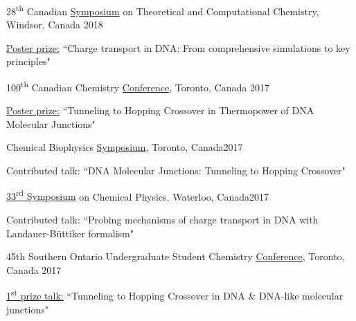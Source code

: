 \documentclass[margin,line]{res}
\newenvironment{list1}{
  \begin{list}{\ding{113}}{%
      \setlength{\itemsep}{0in}
      \setlength{\parsep}{0in} \setlength{\parskip}{0in}
      \setlength{\topsep}{0in} \setlength{\partopsep}{0in} 
      \setlength{\leftmargin}{0.17in}}}{\end{list}}
\begin{document}
\begin{resume}
28\textsuperscript{th} Canadian \href{http://catc.ca/cstcc2018}{Symposium} on Theoretical and Computational Chemistry, Windsor, Canada \hfill {2018}

\begin{list1}
\item[]\underline{Poster prize:} ``Charge transport in DNA: From comprehensive simulations to key principles"
\end{list1}

\vspace*{-2.5mm}

100\textsuperscript{th} Canadian Chemistry \href{https://www.cheminst.ca/magazine/article/csc-celebrates-100-years-of-chemistry-in-toronto/}{Conference}, Toronto, Canada \hfill {2017}

\begin{list1}
\item[]\underline{Poster prize:} ``Tunneling to Hopping Crossover in Thermopower of DNA Molecular Junctions" 
\end{list1}

Chemical Biophysics \href{www.chembiophys.ca}{Symposium}, Toronto, Canada\hfill{2017}

\begin{list1}
\item[]Contributed talk: ``DNA Molecular Junctions:  Tunneling to Hopping Crossover"
\end{list1}

\vspace*{-2.5mm}

\href{http://scp.uwaterloo.ca}{33\textsuperscript{rd} Symposium} on Chemical Physics, Waterloo, Canada\hfill{2017}

\begin{list1}
\item[]Contributed talk: ``Probing mechanisms of charge transport in DNA with Landauer-B\"uttiker formalism"
\end{list1}

\vspace*{-2.5mm}

45th Southern Ontario Undergraduate Student Chemistry \href{https://sites.google.com/view/souscc52/home}{Conference}, Toronto, Canada \hfill{2017}

\begin{list1}
\item[]\underline{1\textsuperscript{st} prize talk:}  ``Tunneling to Hopping Crossover in DNA \& DNA-like molecular junctions"
\end{list1}


\end{resume}
\end{document}
